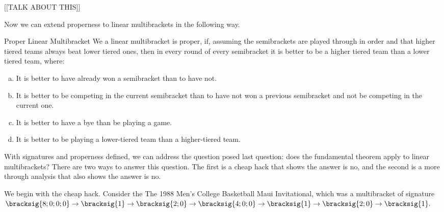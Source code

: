 {    [[TALK ABOUT THIS]]
    



    Now we can extend properness to linear multibrackets in the following way.

    \begin{definition}{Proper Linear Multibracket}{}
        We a linear multibracket is proper, if, assuming the semibrackets are played through in order and that higher tiered teams always beat lower tiered ones, then in every round of every semibracket it is better to be a higher tiered team than a lower tiered team, where:
        \begin{enumerate}[(a)]
            \item It is better to have already won a semibracket than to have not.
            \item It is better to be competing in the current semibracket than to have not won a previous semibracket and not be competing in the current one.
            \item It is better to have a bye than be playing a game.
            \item It is better to be playing a lower-tiered team than a higher-tiered team.
        \end{enumerate}
    \end{definition}

    With signatures and properness defined, we can address the question posed last question: does the fundamental theorem apply to linear multibrackets? There are two ways to answer this question. The first is a cheap hack that shows the answer is no, and the second is a more through analysis that also shows the answer is no.

    We begin with the cheap hack. Consider the The 1988 Men's College Basketball Maui Invitational, which was a multibracket of signature $\bracksig{8;0;0;0} \to \bracksig{1} \to \bracksig{2;0} \to \bracksig{4;0;0} \to \bracksig{1} \to \bracksig{2;0} \to \bracksig{1}.$

}

